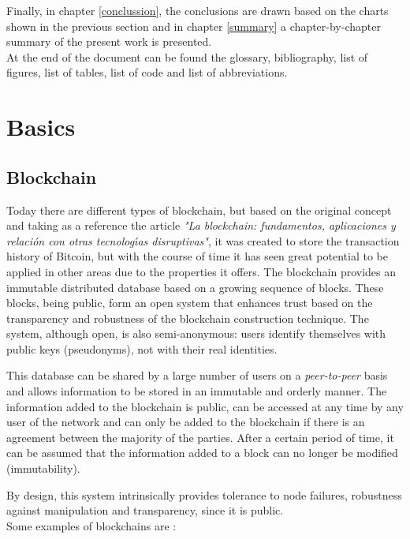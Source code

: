 \documentclass[MSE,Master,english]{twbook}%
\begin{document}
Finally, in chapter \ref{conclussion}, the conclusions are drawn based on the charts shown in the previous section and in chapter \ref{summary} a chapter-by-chapter summary of the present work is presented. \\

At the end of the document can be found the glossary, bibliography, list of figures, list of tables, list of code and list of abbreviations.
\clearpage

\chapter{Basics\label{basics}}
\section{Blockchain}
Today there are different types of blockchain, but based on the original concept and taking as a reference the article \emph{"La blockchain: fundamentos, aplicaciones y relaci{\'o}n con otras tecnolog{\'\i}as disruptivas"}\cite{blockchain}, it was created to store the transaction history of Bitcoin, but with the course of time it has seen great potential to be applied in other areas due to the properties it offers. The blockchain provides an immutable distributed database based on a growing sequence of blocks. These blocks, being public, form an open system that enhances trust based on the transparency and robustness of the blockchain construction technique. The system, although open, is also semi-anonymous: users identify themselves with public keys (pseudonyms), not with their real identities.

This database can be shared by a large number of users on a \emph{peer-to-peer} basis and allows information to be stored in an immutable and orderly manner. The information added to the blockchain is public, can be accessed at any time by any user of the network and can only be added to the blockchain if there is an agreement between the majority of the parties. After a certain period of time, it can be assumed that the information added to a block can no longer be modified (immutability).

By design, this system intrinsically provides tolerance to node failures, robustness against manipulation and transparency, since it is public. \\

Some examples of blockchains are \cite{blockchainDummies}:
\end{document}
